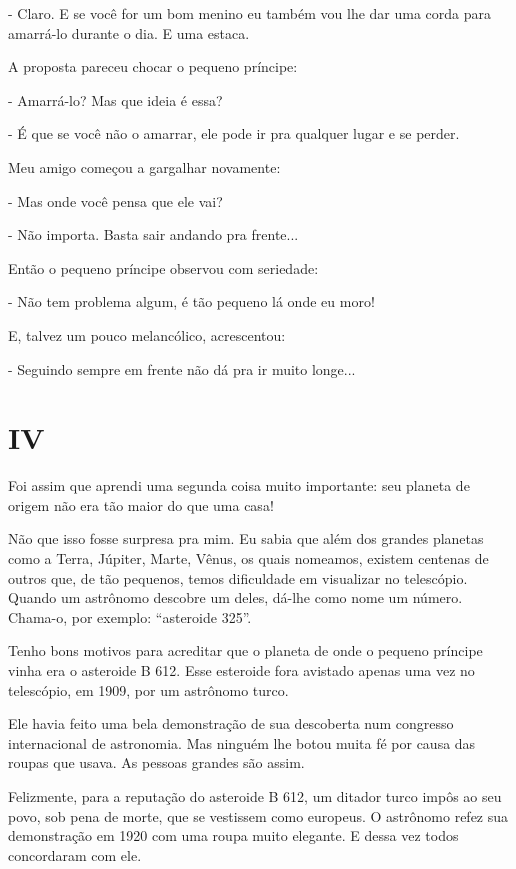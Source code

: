 \begin{Parallel}[p]{}{}
{- Claro. E se você for um bom menino eu também vou lhe dar uma corda
para amarrá-lo durante o dia. E uma estaca.

A proposta pareceu chocar o pequeno príncipe:

- Amarrá-lo? Mas que ideia é essa?

- É que se você não o amarrar, ele pode ir pra qualquer lugar e se
perder.

Meu amigo começou a gargalhar novamente:

- Mas onde você pensa que ele vai?

- Não importa. Basta sair andando pra frente...

Então o pequeno príncipe observou com seriedade:

- Não tem problema algum, é tão pequeno lá onde eu moro!

E, talvez um pouco melancólico, acrescentou:

- Seguindo sempre em frente não dá pra ir muito longe...\\
}

\end{Parallel}



\chapter{IV}

Foi assim que aprendi uma segunda coisa muito importante: seu planeta de
origem não era tão maior do que uma casa!

Não que isso fosse surpresa pra mim. Eu sabia que além dos grandes
planetas como a Terra, Júpiter, Marte, Vênus, os quais nomeamos, existem
centenas de outros que, de tão pequenos, temos dificuldade em visualizar
no telescópio. Quando um astrônomo descobre um deles, dá-lhe como nome
um número. Chama-o, por exemplo: ``asteroide 325''.

Tenho bons motivos para acreditar que o planeta de onde o pequeno
príncipe vinha era o asteroide B 612. Esse esteroide fora avistado
apenas uma vez no telescópio, em 1909, por um astrônomo turco.

Ele havia feito uma bela demonstração de sua descoberta num congresso
internacional de astronomia. Mas ninguém lhe botou muita fé por causa
das roupas que usava. As pessoas grandes são assim.

Felizmente, para a reputação do asteroide B 612, um ditador turco impôs
ao seu povo, sob pena de morte, que se vestissem como europeus. O
astrônomo refez sua demonstração em 1920 com uma roupa muito elegante. E
dessa vez todos concordaram com ele.

